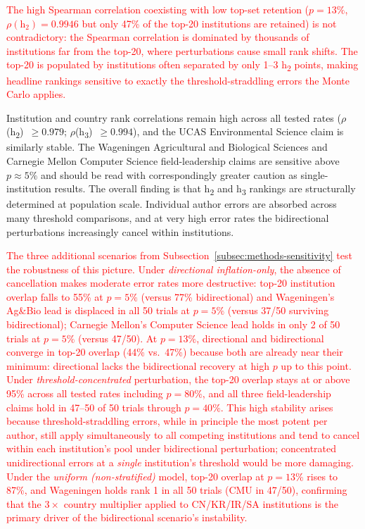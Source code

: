 \textcolor{red}{The high Spearman correlation coexisting with low top-set retention ($p = 13\%$, $\rho(\mathrm{h}_2) = 0.9946$ but only 47\% of the top-20 institutions are retained) is not contradictory: the Spearman correlation is dominated by thousands of institutions far from the top-20, where perturbations cause small rank shifts. The top-20 is populated by institutions often separated by only 1--3 h\textsubscript{2} points, making headline rankings sensitive to exactly the threshold-straddling errors the Monte Carlo applies.}

Institution and country rank correlations remain high across all tested rates ($\rho$(h\textsubscript{2})~$\geq 0.979$; $\rho$(h\textsubscript{3})~$\geq 0.994$), and the UCAS Environmental Science claim is similarly stable. The Wageningen Agricultural and Biological Sciences and Carnegie Mellon Computer Science field-leadership claims are sensitive above $p \approx 5\%$ and should be read with correspondingly greater caution as single-institution results. The overall finding is that h\textsubscript{2} and h\textsubscript{3} rankings are structurally determined at population scale. Individual author errors are absorbed across many threshold comparisons, and at very high error rates the bidirectional perturbations increasingly cancel within institutions.

\textcolor{red}{The three additional scenarios from Subsection~\ref{subsec:methods-sensitivity} test the robustness of this picture. Under \emph{directional inflation-only}, the absence of cancellation makes moderate error rates more destructive: top-20 institution overlap falls to 55\% at $p=5\%$ (versus 77\% bidirectional) and Wageningen's Ag\&Bio lead is displaced in all 50 trials at $p=5\%$ (versus 37/50 surviving bidirectional); Carnegie Mellon's Computer Science lead holds in only 2 of 50 trials at $p=5\%$ (versus 47/50). At $p=13\%$, directional and bidirectional converge in top-20 overlap (44\% vs.\ 47\%) because both are already near their minimum: directional lacks the bidirectional recovery at high $p$ up to this point. 
Under \emph{threshold-concentrated} perturbation, the top-20 overlap stays at or above 95\% across all tested rates including $p=80\%$, and all three field-leadership claims hold in 47--50 of 50 trials through $p=40\%$. This high stability arises because threshold-straddling errors, while in principle the most potent per author, still apply simultaneously to all competing institutions and tend to cancel within each institution's pool under bidirectional perturbation; concentrated unidirectional errors at a \emph{single} institution's threshold would be more damaging. 
Under the \emph{uniform (non-stratified)} model, top-20 overlap at $p=13\%$ rises to 87\%, and Wageningen holds rank 1 in all 50 trials (CMU in 47/50), confirming that the $3\times$ country multiplier applied to CN/KR/IR/SA institutions is the primary driver of the bidirectional scenario's instability.}

